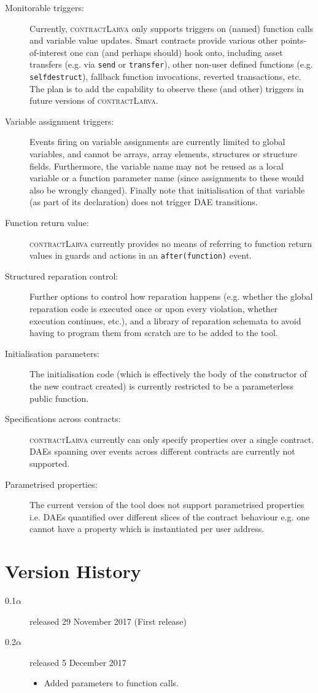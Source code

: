 \documentclass{article}
\newcommand{\contractlarva}{\textsc{contractLarva}\xspace}
\begin{document}
  \begin{description}
    \item[Monitorable triggers:] Currently, \contractlarva only supports triggers on (named) function calls and variable value updates. Smart contracts provide various other points-of-interest one can (and perhaps should) hook onto, including asset transfers (e.g. via \texttt{send} or \texttt{transfer}), other non-user defined functions (e.g. \texttt{selfdestruct}), fallback function invocations, reverted transactions, etc. The plan is to add the capability to observe these (and other) triggers in future versions of \contractlarva.   
    \item[Variable assignment triggers:] Events firing on variable assignments are currently limited to global variables, and cannot be arrays, array elements, structures or structure fields. Furthermore, the variable name may not be reused as a local variable or a function parameter name (since assignments to these would also be wrongly changed). Finally note that initialisation of that variable (as part of its declaration) does not trigger DAE transitions.
    \item[Function return value:] \contractlarva currently provides no means of referring to function return values in guards and actions in an \texttt{after(function)} event.
    \item[Structured reparation control:] Further options to control how reparation happens (e.g. whether the global reparation code is executed once or upon every violation, whether execution continues, etc.), and a library of reparation schemata to avoid having to program them from scratch are to be added to the tool. 
    \item[Initialisation parameters:] The initialisation code (which is effectively the body of the constructor of the new contract created) is currently restricted to be a parameterless public function.
    \item[Specifications across contracts:] \contractlarva currently can only specify properties over a single contract. DAEs spanning over events across different contracts are currently not supported. 
    \item[Parametrised properties:] The current version of the tool does not support parametrised properties i.e. DAEs quantified over different slices of the contract behaviour e.g. one cannot have a property which is instantiated per user address. 
  \end{description}
  
  \section{Version History}
\begin{description}
\item[0.1$\alpha$] released 29 November 2017 (First release)
\item[0.2$\alpha$] released 5 December 2017
\begin{itemize}
  \item Added parameters to function calls.
\end{itemize}
\end{description}

  
\end{document}
